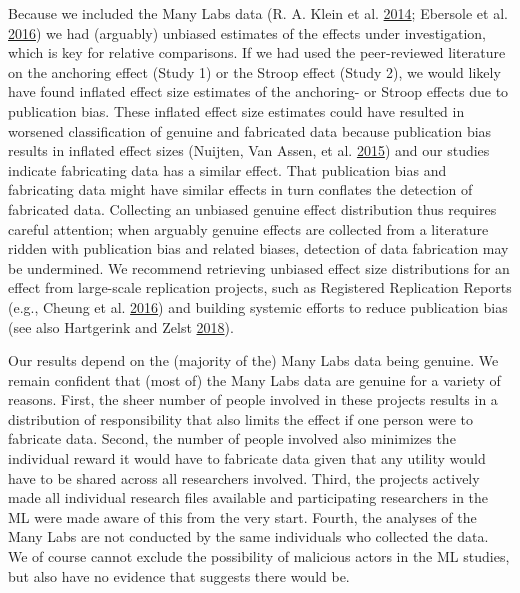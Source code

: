 \documentclass[a5paper]{book}
\begin{document}
Because we included the Many Labs data (R. A. Klein et al.
\protect\hyperlink{ref-doi:10.1027ux2f1864-9335ux2fa000178}{2014};
Ebersole et al.
\protect\hyperlink{ref-doi:10.1016ux2fj.jesp.2015.10.012}{2016}) we had
(arguably) unbiased estimates of the effects under investigation, which
is key for relative comparisons. If we had used the peer-reviewed
literature on the anchoring effect (Study 1) or the Stroop effect (Study
2), we would likely have found inflated effect size estimates of the
anchoring- or Stroop effects due to publication bias. These inflated
effect size estimates could have resulted in worsened classification of
genuine and fabricated data because publication bias results in inflated
effect sizes (Nuijten, Van Assen, et al.
\protect\hyperlink{ref-doi:10.1037ux2fgpr0000034}{2015}) and our studies
indicate fabricating data has a similar effect. That publication bias
and fabricating data might have similar effects in turn conflates the
detection of fabricated data. Collecting an unbiased genuine effect
distribution thus requires careful attention; when arguably genuine
effects are collected from a literature ridden with publication bias and
related biases, detection of data fabrication may be undermined. We
recommend retrieving unbiased effect size distributions for an effect
from large-scale replication projects, such as Registered Replication
Reports (e.g., Cheung et al.
\protect\hyperlink{ref-doi:10.1177ux2f1745691616664694}{2016}) and
building systemic efforts to reduce publication bias (see also
Hartgerink and Zelst
\protect\hyperlink{ref-doi:10.3390ux2fpublications6020021}{2018}).

Our results depend on the (majority of the) Many Labs data being
genuine. We remain confident that (most of) the Many Labs data are
genuine for a variety of reasons. First, the sheer number of people
involved in these projects results in a distribution of responsibility
that also limits the effect if one person were to fabricate data.
Second, the number of people involved also minimizes the individual
reward it would have to fabricate data given that any utility would have
to be shared across all researchers involved. Third, the projects
actively made all individual research files available and participating
researchers in the ML were made aware of this from the very start.
Fourth, the analyses of the Many Labs are not conducted by the same
individuals who collected the data. We of course cannot exclude the
possibility of malicious actors in the ML studies, but also have no
evidence that suggests there would be.
\end{document}
